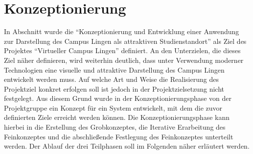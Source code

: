 \section{Konzeptionierung}
\label{sec:Konzeptionierung}

In Abschnitt  wurde die "`Konzeptionierung und Entwicklung
einer Anwendung zur Darstellung des Campus Lingen als attraktiven
Studienstandort"' als Ziel des Projektes "`Virtueller Campus Lingen"'
definiert. An den Unterzielen, die dieses Ziel näher definieren, wird weiterhin
deutlich, dass unter Verwendung moderner Technologien eine visuelle und
attraktive Darstellung des Campus Lingen entwickelt werden muss. Auf welche Art
und Weise die Realisierung des Projektziel konkret erfolgen soll ist jedoch in
der Projektzielsetzung nicht festgelegt. Aus diesem Grund wurde in der
Konzeptionierungsphase von der Projektgruppe ein Konzept für ein System
entwickelt, mit dem die zuvor definierten Ziele erreicht werden können. Die
Konzeptionierungsphase kann hierbei in die Erstellung des Grobkonzeptes, die
Iterative Erarbeitung des Feinkonzeptes und die abschließende Festlegung des
Feinkonzeptes unterteilt werden. Der Ablauf der drei Teilphasen soll im
Folgenden näher erläutert werden.






